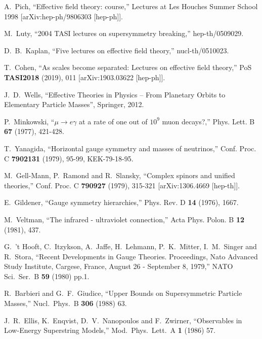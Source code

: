 \documentclass[12pt]{article}
\numberwithin{equation}{section}
\begin{document}
\begin{thebibliography}{999}
A.~Pich,
``Effective field theory: course,'' Lectures at Les Houches Summer School 1998
[arXiv:hep-ph/9806303 [hep-ph]].

  M.~Luty, ``2004 TASI lectures on supersymmetry breaking,''
  hep-th/0509029.

  D.~B.~Kaplan,
  ``Five lectures on effective field theory,'' nucl-th/0510023.

T.~Cohen,
``As scales become separated: Lectures on effective field theory,''
PoS \textbf{TASI2018} (2019), 011
[arXiv:1903.03622 [hep-ph]].

J.~D.~Wells,
``Effective Theories in Physics -- From Planetary Orbits to Elementary Particle Masses'', Springer, 2012.

P.~Minkowski,
``$\mu \to e\gamma$ at a rate of one out of $10^{9}$ muon decays?,''
Phys. Lett. B \textbf{67} (1977), 421-428.

T.~Yanagida,
``Horizontal gauge symmetry and masses of neutrinos,''
Conf. Proc. C \textbf{7902131} (1979), 95-99, 
KEK-79-18-95.

M.~Gell-Mann, P.~Ramond and R.~Slansky,
``Complex spinors and unified theories,''
Conf. Proc. C \textbf{790927} (1979), 315-321
[arXiv:1306.4669 [hep-th]].

E.~Gildener, ``Gauge symmetry hierarchies,''
Phys. Rev. D \textbf{14} (1976), 1667.

M.~Veltman, ``The infrared - ultraviolet connection,''
Acta Phys. Polon. B \textbf{12} (1981), 437.

  G.~'t Hooft, C.~Itzykson, A.~Jaffe, H.~Lehmann, P.~K.~Mitter, I.~M.~Singer
  and R.~Stora,
  ``Recent Developments in Gauge Theories. Proceedings, Nato Advanced Study 
  Institute, Cargese, France, August 26 - September 8, 1979,''
  NATO Sci.\ Ser.\ B {\bf 59} (1980) pp.1.

  R.~Barbieri and G.~F.~Giudice,
  ``Upper Bounds on Supersymmetric Particle Masses,''
  Nucl.\ Phys.\ B {\bf 306} (1988) 63.

  J.~R.~Ellis, K.~Enqvist, D.~V.~Nanopoulos and F.~Zwirner,
  ``Observables in Low-Energy Superstring Models,''
  Mod.\ Phys.\ Lett.\ A {\bf 1} (1986) 57.


\end{thebibliography}
\end{document}

